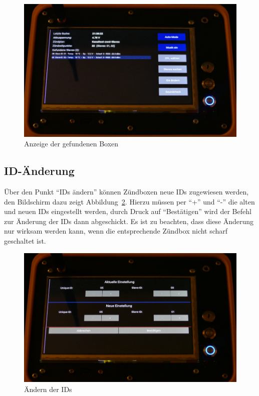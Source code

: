 \documentclass[paper=a4, parskip, numbers=noenddot, toc=listof, headsepline]{scrbook}
\begin{document}
				\begin{figure}
					\centering\includegraphics[width=150mm]{Bilder/REFslavesfound}
					\caption{Anzeige der gefundenen Boxen}
					\label{fig:REFslavesfound}
				\end{figure}
							
			\subsection{ID-Änderung}
			
				Über den Punkt \enquote{IDs ändern} können Zündboxen neue IDs zugewiesen werden, den Bildschirm dazu zeigt Abbildung~\ref{fig:REFids}. Hierzu müssen per \enquote{+} und \enquote{-} die alten und neuen IDs eingestellt werden, durch Druck auf \enquote{Bestätigen} wird der Befehl zur Änderung der IDs dann abgeschickt. Es ist zu beachten, dass diese Änderung nur wirksam werden kann, wenn die entsprechende Zündbox nicht scharf geschaltet ist.
				
				\begin{figure}
					\centering\includegraphics[width=150mm]{Bilder/REFids}
					\caption{Ändern der IDs}
					\label{fig:REFids}
				\end{figure}		
			
\end{document}
